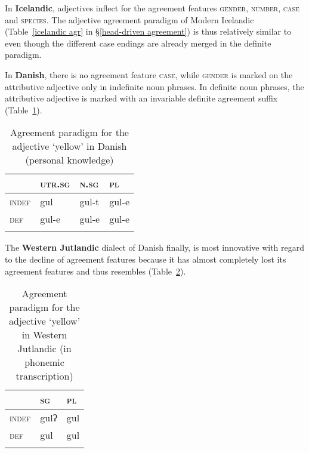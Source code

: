 In \textbf{Icelandic}, adjectives inflect for the agreement features \textsc{gender}, \textsc{number}, \textsc{case} and \textsc{species}. The adjective agreement paradigm of Modern Icelandic (Table~\ref{icelandic agr} in \S\ref{head-driven agreement}) is thus relatively similar to  even though the different case endings are already merged in the definite paradigm.

In \textbf{Danish},\label{danish synchr} there is no agreement feature \textsc{case}, while \textsc{gender} is marked on the attributive adjective only in indefinite noun phrases. In definite noun phrases, the attributive adjective is marked with an invariable definite agreement suffix (Table~\ref{danish agr paradigm}).
\begin{table}
\begin{tabular}{l l l l}
\lsptoprule
		& \textsc{utr.sg}	&\textsc{n.sg}	&\textsc{pl}\\
\midrule
\textsc{indef}	&gul	 	&gul-t		&gul-e\\

\textsc{def}	&gul-e	&gul-e		&gul-e\\
\lspbottomrule
\end{tabular}
\caption[Adjective paradigm for Danish]{Agreement paradigm for the adjective ‘yellow’ in Danish (personal knowledge)}
\label{danish agr paradigm}
\end{table}
The \textbf{Western Jutlandic} dialect of Danish finally, is most innovative with regard to the decline of agreement features because it has almost completely lost its agreement features and thus resembles  (Table~\ref{jutl agr paradigm}).
\begin{table}
\begin{tabular}{l l l}
\lsptoprule		& \textsc{sg}	&\textsc{pl}\\
\midrule
\textsc{indef}	& gulʔ	 	&gul\\

\textsc{def}	&gul			&gul\\
\lspbottomrule
\end{tabular}
\caption[Adjective paradigm for W-Jutlandic]{Agreement paradigm for the adjective ‘yellow’ in Western Jutlandic (in phonemic transcription) \citep{ringgaard1960}}
\label{jutl agr paradigm}
\end{table}

